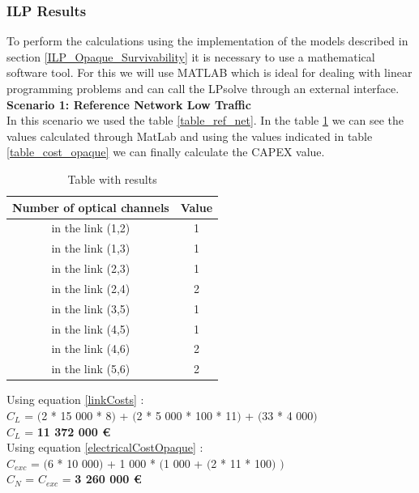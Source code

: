 \subsubsection{ILP Results}

To perform the calculations using the implementation of the models described in section \ref{ILP_Opaque_Survivability} it is necessary to use a mathematical software tool. For this we will use MATLAB which is ideal for dealing with linear programming problems and can call the LPsolve through an external interface. \\

\textbf{Scenario 1: Reference Network Low Traffic} \label{Scenario1_opaque} \\

In this scenario we used the table \ref{table_ref_net}. In the table \ref{result_ILP1_reference} we can see the values calculated through MatLab and using the values indicated in table \ref{table_cost_opaque} we can finally calculate the CAPEX value.
\begin{table}[h!]
\centering
\begin{tabular}{|| c | c||}
 \hline
 Number of optical channels & Value \\
 \hline\hline
 in the link (1,2) & 1 \\
 in the link (1,3) & 1 \\
 in the link (2,3) & 1 \\
 in the link (2,4) & 2 \\
 in the link (3,5) & 1 \\
 in the link (4,5) & 1 \\
 in the link (4,6) & 2 \\
 in the link (5,6) & 2 \\
 \hline
\end{tabular}
\caption{Table with results}
\label{result_ILP1_reference}
\end{table}

Using equation \ref{linkCosts} : \\
$C_L$ = $($2 * 15 000 * 8$)$ + $($2 * 5 000 * 100 * 11$)$ + $($33 * 4 000$)$ \\
$C_L$ = \textbf{11 372 000 \euro} \\


Using equation \ref{electricalCostOpaque} : \\
$C_{exc}$ = $($6 * 10 000$)$ + 1 000 * $($1 000 + $($2 * 11 * 100$)$ $)$ \\
$C_N$ = $C_{exc}$ = \textbf{3 260 000 \euro} \\


